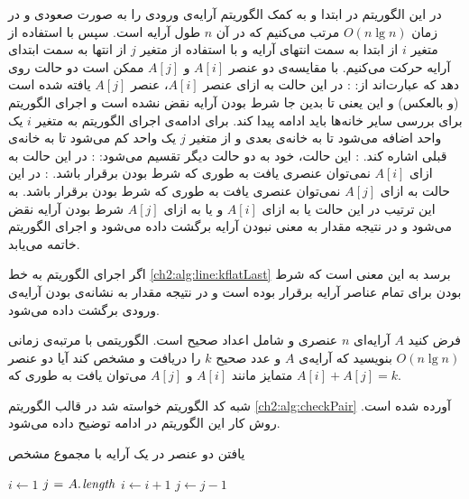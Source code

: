 در این الگوریتم در ابتدا و به کمک الگوریتم {} آرایه‌ی ورودی را به صورت صعودی و در زمان {$O(n\lg n)$} مرتب می‌کنیم که در آن {$n$} طول آرایه است. سپس با استفاده از متغیر {$i$} از ابتدا به سمت انتهای آرایه و با استفاده از متغیر {$j$} از انتها به سمت ابتدای آرایه‌ حرکت می‌کنیم. با مقایسه‌ی دو عنصر {$A[i]$} و {$A[j]$} ممکن است دو حالت روی دهد که عبارت‌اند از:
: در این حالت به ازای عنصر {$A[i]$}، عنصر {$A[j]$} یافته شده است (و بالعکس) و این یعنی تا بدین جا شرط
 {} بودن آرایه نقض نشده است و اجرای الگوریتم برای بررسی سایر خانه‌ها باید ادامه پیدا کند. برای ادامه‌ی اجرای الگوریتم به متغیر {$i$} یک واحد اضافه می‌شود تا به خانه‌ی بعدی و از متغیر {$j$} یک واحد کم می‌شود تا به خانه‌ی قبلی اشاره کند.
: این حالت، خود به دو حالت دیگر تقسیم می‌شود:
: در این حالت به ازای {$A[i]$} نمی‌توان عنصری یافت به طوری که شرط {} بودن برقرار باشد. 
: در این حالت به ازای {$A[j]$} نمی‌توان عنصری یافت به طوری که شرط {} بودن برقرار باشد. 
به این ترتیب در این حالت یا به ازای {$A[i]$} و یا به ازای {$A[j]$} شرط {} بودن آرایه نقض می‌شود و در نتیجه مقدار {} به معنی {} نبودن آرایه برگشت داده می‌شود و اجرای الگوریتم خاتمه می‌یابد.

اگر اجرای الگوریتم به خط {\ref{ch2:alg:line:kflatLast}} برسد به این معنی است که شرط {} بودن برای تمام عناصر آرایه برقرار بوده است و در نتیجه مقدار {} به نشانه‌ی {} بودن آرایه‌ی ورودی برگشت داده می‌شود.

 فرض کنید {$A$} آرایه‌ای {$n$} عنصری و شامل اعداد صحیح است. الگوریتمی با مرتبه‌ی زمانی {$O(n\lg n)$} بنویسید که آرایه‌‌ی {$A$} و عدد صحیح {$k$} را دریافت و مشخص کند آیا دو عنصر متمایز مانند {$A[i]$} و {$A[j]$} می‌توان یافت به طوری که {$A[i]+A[j]=k$}.


شبه کد الگوریتم خواسته شد در قالب الگوریتم {\eqref{ch2:alg:checkPair}} آورده شده است. روش کار این الگوریتم در ادامه توضیح داده می‌شود.

\begin{algorithm}
\caption{یافتن دو عنصر در یک آرایه با مجموع مشخص}\label{ch2:alg:checkPair}
\begin{latin}
\begin{algorithmic}[1]
		\State	{}
		\State 	$i \gets 1$
		\State 	$j \mathrel{\hspace{1pt}=\hspace{1pt}} A.\hspace*{1pt}\mathit{length}$
					\State	\Return {}
					\State	$i \gets i+1$
				\Else
					\State	$j \gets j-1$
				\EndIf
		\EndWhile
		\State \Return {}\label{ch2:alg:ln:chkPairLast}
\EndFunction
\end{algorithmic}
\end{latin}
\end{algorithm}

